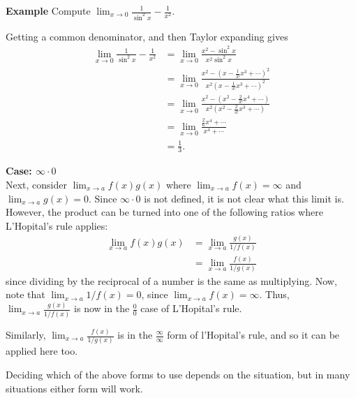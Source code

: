 \documentclass[twoside,openright,titlepage,a4paper]{book}
\begin{document}
\begin{sloppypar}
\textbf{Example} Compute $\displaystyle \lim_{x \rightarrow 0} \frac{1}{\sin^2 x} - \frac{1}{x^2}$. 
\begin{examplebox}
Getting a common denominator, and then Taylor expanding gives
\begin{align*}
\lim_{x \rightarrow 0} \frac{1}{\sin^2x} - \frac{1}{x^2} &= \lim_{x\rightarrow 0} \frac{x^2 - \sin^2x}{x^2 \sin^2x } \\
&= \lim_{ x\rightarrow 0} \frac{x^2 - \left(x-\frac{1}{3!}x^3 + \dotsb \right)^2}{x^2 \left(x- \frac{1}{3!}x^3 + \dotsb\right)^2} \\
&= \lim_{x \rightarrow 0} \frac{x^2 - \left(x^2 - \frac{2}{3!}x^4 + \dotsb\right)}{x^2 \left(x^2 - \frac{2}{3!}x^3 + \dotsb\right)} \\
&= \lim_{x \rightarrow 0} \frac{\frac{2}{6}x^4 + \dotsb}{x^4 + \dotsb} \\
&= \frac{1}{3}.
\end{align*}
\end{examplebox}
\bigbreak
\noindent \textbf{Case: $\infty \cdot 0$}\\

Next, consider $\displaystyle \lim_{x \rightarrow a} f(x)g(x)$ where $\displaystyle \lim_{x \rightarrow a} f(x) = \infty$ and $\displaystyle \lim_{x \rightarrow a}g(x) = 0$. Since $\infty \cdot 0$ is not defined, it is not clear what this limit is. However, the product can be turned into one of the following ratios where L'Hopital's rule applies:
\begin{align*}
\lim_{x \rightarrow a} f(x)g(x) &= \lim_{x \rightarrow a} \frac{g(x)}{1/f(x)} \\
&= \lim_{x \rightarrow a} \frac{f(x)}{1/g(x)}
\end{align*}
since dividing by the reciprocal of a number is the same as multiplying. Now, note that $\displaystyle \lim_{x \rightarrow a} 1/f(x) = 0$, since $\displaystyle \lim_{x \rightarrow a} f(x) = \infty$. Thus, $ \displaystyle \lim_{x \rightarrow a} \frac{g(x)}{1/f(x)}$ is now in the $\frac{0}{0}$ case of L'Hopital's rule.

Similarly, $\displaystyle \lim_{x \rightarrow a} \frac{f(x)}{1/g(x)}$ is in the $\frac{\infty}{\infty}$ form of l'Hopital's rule, and so it can be applied here too.

Deciding which of the above forms to use depends on the situation, but in many situations either form will work.


\end{sloppypar}
\end{document}
